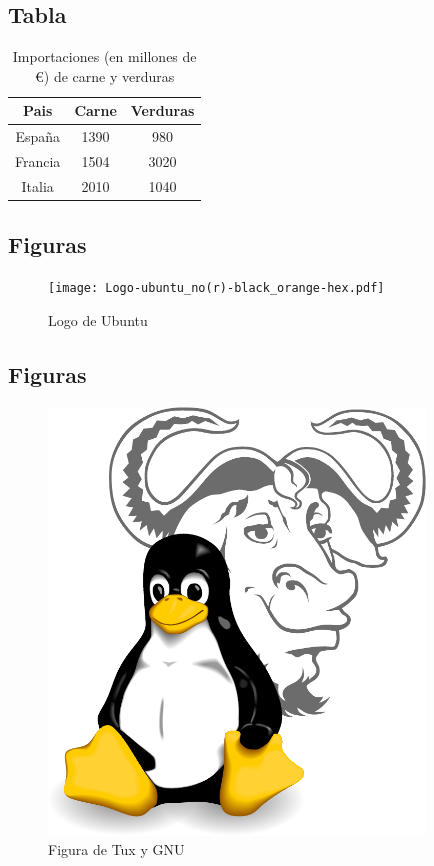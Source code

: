 \documentclass[a4,11pt]{article}
\begin{document}
\subsection{Tabla}
\begin{table}[h]
  \begin{center}
    \begin{tabular}{ccc}
      Pais   &Carne&Verduras\\ \hline
      España &1390 &980     \\
      Francia&1504 &3020    \\
      Italia &2010 &1040    \\
    \end{tabular}
  \end{center}
  \caption{Importaciones (en millones de €) de carne y verduras}\label{tab:importaciones}
\end{table}


\subsection{Figuras}
\begin{figure}[h]
  \begin{center}
    \texttt{[image: Logo-ubuntu\_no(r)-black\_orange-hex.pdf]}
  \end{center}
  \caption{Logo de Ubuntu}\label{fig:ubuntu}
\end{figure} 


\subsection{Figuras}
\begin{figure}[h]
  \begin{center}
    \includegraphics[width=10cm]{Gnulinux.pdf}
  \end{center}
  \caption{Figura de Tux y GNU}\label{fig:gnutux}
\end{figure} 
\end{document}
